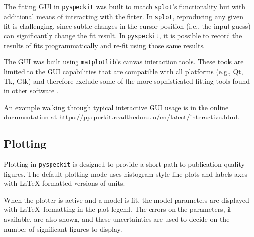 \documentclass[twocolumn,linenumbers]{aastex63}
\newcommand{\pyspeckit}{\texttt{pyspeckit}\xspace}
\newcommand{\astropy}{\texttt{astropy}\xspace}
\begin{document}
The fitting GUI in \texttt{pyspeckit} was built to match \texttt{splot}'s
functionality but with additional means of interacting with the fitter.  In
\texttt{splot}, reproducing any given fit is challenging, since subtle changes
in the cursor position (i.e., the input guess) can significantly change the fit
result.  In \pyspeckit, it is possible to record the results of fits
programmatically and re-fit using those same results.

The GUI was built using \texttt{matplotlib}'s canvas interaction tools.  These
tools are limited to the GUI capabilities that are compatible with all platforms
(e.g., Qt, Tk, Gtk) and therefore exclude some of the more sophisticated fitting
tools found in other software \citep[e.g., \texttt{glue};][]{Beaumont2014b}. 

An example walking through typical interactive GUI usage is in the online
documentation at \url{https://pyspeckit.readthedocs.io/en/latest/interactive.html}.

\subsection{Plotting}
Plotting in \pyspeckit is designed to provide a short path to
publication-quality figures.  The default plotting mode uses histogram-style
line plots and labels axes with \LaTeX-formatted versions of units.

When the plotter is active and a model is fit, the model parameters are
displayed with \LaTeX~formatting in the plot legend.  The errors on the
parameters, if available, are also shown, and these uncertainties are used to
decide on the number of significant figures to display.

\end{document}
